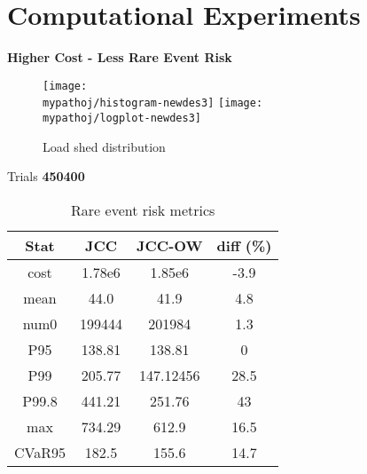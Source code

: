 \section{Computational Experiments}



\textbf{Higher Cost - Less Rare Event Risk}

\begin{figure}
\centering
\texttt{[image: \\mypathoj/histogram-newdes3]}
\texttt{[image: \\mypathoj/logplot-newdes3]}
\caption{Load shed distribution}
\end{figure}


\begin{table}
\centering
Trials \textbf{450400}

\begin{tabular}{|c |  c c | c|}
\hline
Stat & JCC & JCC-OW & diff (\%) \\
\hline
cost&1.78e6 & 1.85e6 & \alert{-3.9} \\
mean&44.0&41.9 & 4.8   \\
num0&199444 & 201984 & 1.3 \\
P95& 138.81& 138.81  &  0         \\
P99& 205.77& 147.12456 &  28.5        \\
P99.8& 441.21& 251.76   &  43      \\
max& 734.29& 612.9      &  16.5            \\
CVaR95 & 182.5 & 155.6 & 14.7 \\
\hline
\end{tabular}
\caption{Rare event risk metrics}
\end{table}


